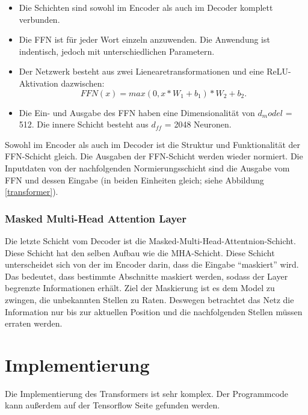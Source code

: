 \begin{itemize}[leftmargin=1cm]
	\item Die Schichten sind sowohl im Encoder als auch im Decoder komplett verbunden.
	
	\item Die FFN ist für jeder Wort einzeln anzuwenden. Die Anwendung ist indentisch, jedoch mit unterschiedlichen Parametern.
	
	\item Der Netzwerk besteht aus zwei Lienearetransformationen und eine ReLU-Aktivation dazwischen:
	\begin{equation}
		FFN(x) = max(0, x*W_1 + b_1)*W_2 + b_2.
	\end{equation}
	
	\item Die Ein- und Ausgabe des FFN haben eine Dimensionalität von $d_model$ = 512. Die innere Schicht besteht aus $d_{ff}$	= 2048 Neuronen.
\end{itemize}

Sowohl im Encoder als auch im Decoder ist die Struktur und Funktionalität der FFN-Schicht gleich. Die Ausgaben der FFN-Schicht werden wieder normiert. Die Inputdaten von der nachfolgenden Normierungsschicht sind die Ausgabe vom FFN und dessen Eingabe (in beiden Einheiten gleich; siehe Abbildung \ref{transformer}).


\subsubsection{Masked Multi-Head Attention Layer}

Die letzte Schicht vom Decoder ist die Masked-Multi-Head-Attentnion-Schicht. Diese Schicht hat den selben Aufbau wie die MHA-Schicht. Diese Schicht unterscheidet sich von der im Encoder darin, dass die Eingabe  ``maskiert'' wird. Das bedeutet, dass bestimmte Abschnitte maskiert werden, sodass der Layer begrenzte Informationen erhält. Ziel der Maskierung ist es dem Model zu zwingen, die unbekannten Stellen zu Raten. Deswegen betrachtet das Netz die Information nur bis zur aktuellen Position und die nachfolgenden Stellen müssen erraten werden.

\section{Implementierung}

Die Implementierung des Transformers ist sehr komplex. Der Programmcode kann außerdem auf der Tensorflow Seite \cite{transformer_tensorflow:21} gefunden werden. 

